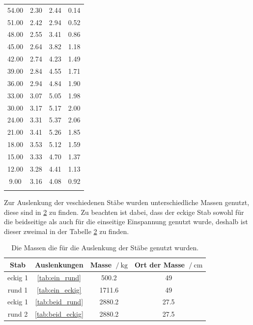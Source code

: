 \begin{table}
\begin{tabular}[t]{cccc}
    54.00 & 2.30 & 2.44 & 0.14 \\
    51.00 & 2.42 & 2.94 & 0.52 \\
    48.00 & 2.55 & 3.41 & 0.86 \\
    45.00 & 2.64 & 3.82 & 1.18 \\
    42.00 & 2.74 & 4.23 & 1.49 \\
    39.00 & 2.84 & 4.55 & 1.71 \\
    36.00 & 2.94 & 4.84 & 1.90 \\
    33.00 & 3.07 & 5.05 & 1.98 \\
    30.00 & 3.17 & 5.17 & 2.00 \\
    24.00 & 3.31 & 5.37 & 2.06 \\
    21.00 & 3.41 & 5.26 & 1.85 \\
    18.00 & 3.53 & 5.12 & 1.59 \\
    15.00 & 3.33 & 4.70 & 1.37 \\
    12.00 & 3.28 & 4.41 & 1.13 \\
    9.00 & 3.16 & 4.08 & 0.92 \\

    \bottomrule
    
    \label{tab:beid_rund}
\end{tabular}
\label{tab:beidseitig}
\end{table}


Zur Auslenkung der veschiedenen Stäbe wurden unterschiedliche Massen genutzt, diese sind in \ref{tab:massen} zu finden.
Zu beachten ist dabei, dass der eckige Stab sowohl für die beidseitige als auch für die einseitige Einspannung genutzt wurde, deshalb ist dieser zweimal in der Tabelle \ref{tab:massen} zu finden.
\begin{table}
\centering
\caption{Die Massen die für die Auslenkung der Stäbe genutzt wurden.}
\begin{tabular}{cccc}
    \toprule
   Stab & Auslenkungen & Masse $\:/\:\si{\kilo\gram}$ & Ort der Masse $\:/\:\si{\centi\meter}$ \\
    \midrule
    eckig 1  & \ref{tab:ein_rund} & 500.2 & 49 \\
    rund  1  & \ref{tab:ein_eckig} & 1711.6 & 49 \\
    eckig 1  & \ref{tab:beid_rund} & 2880.2 & 27.5 \\
    rund  2  & \ref{tab:beid_eckig} & 2880.2 & 27.5 \\
    \bottomrule
\end{tabular}
\label{tab:massen}
\end{table}



